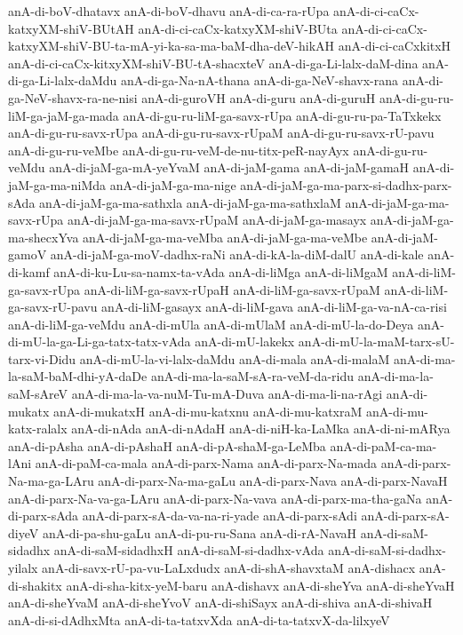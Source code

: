 {anA-di-boV-dhatavx
anA-di-boV-dhavu
anA-di-ca-ra-rUpa
anA-di-ci-caCx-katxyXM-shiV-BUtAH
anA-di-ci-caCx-katxyXM-shiV-BUta
anA-di-ci-caCx-katxyXM-shiV-BU-ta-mA-yi-ka-sa-ma-baM-dha-deV-hikAH
anA-di-ci-caCxkitxH
anA-di-ci-caCx-kitxyXM-shiV-BU-tA-shacxteV
anA-di-ga-Li-lalx-daM-dina
anA-di-ga-Li-lalx-daMdu
anA-di-ga-Na-nA-thana
anA-di-ga-NeV-shavx-rana
anA-di-ga-NeV-shavx-ra-ne-nisi
anA-di-guroVH
anA-di-guru
anA-di-guruH
anA-di-gu-ru-liM-ga-jaM-ga-mada
anA-di-gu-ru-liM-ga-savx-rUpa
anA-di-gu-ru-pa-TaTxkekx
anA-di-gu-ru-savx-rUpa
anA-di-gu-ru-savx-rUpaM
anA-di-gu-ru-savx-rU-pavu
anA-di-gu-ru-veMbe
anA-di-gu-ru-veM-de-nu-titx-peR-nayAyx
anA-di-gu-ru-veMdu
anA-di-jaM-ga-mA-yeYvaM
anA-di-jaM-gama
anA-di-jaM-gamaH
anA-di-jaM-ga-ma-niMda
anA-di-jaM-ga-ma-nige
anA-di-jaM-ga-ma-parx-si-dadhx-parx-sAda
anA-di-jaM-ga-ma-sathxla
anA-di-jaM-ga-ma-sathxlaM
anA-di-jaM-ga-ma-savx-rUpa
anA-di-jaM-ga-ma-savx-rUpaM
anA-di-jaM-ga-masayx
anA-di-jaM-ga-ma-shecxYva
anA-di-jaM-ga-ma-veMba
anA-di-jaM-ga-ma-veMbe
anA-di-jaM-gamoV
anA-di-jaM-ga-moV-dadhx-raNi
anA-di-kA-la-diM-dalU
anA-di-kale
anA-di-kamf
anA-di-ku-Lu-sa-namx-ta-vAda
anA-di-liMga
anA-di-liMgaM
anA-di-liM-ga-savx-rUpa
anA-di-liM-ga-savx-rUpaH
anA-di-liM-ga-savx-rUpaM
anA-di-liM-ga-savx-rU-pavu
anA-di-liM-gasayx
anA-di-liM-gava
anA-di-liM-ga-va-nA-ca-risi
anA-di-liM-ga-veMdu
anA-di-mUla
anA-di-mUlaM
anA-di-mU-la-do-Deya
anA-di-mU-la-ga-Li-ga-tatx-tatx-vAda
anA-di-mU-lakekx
anA-di-mU-la-maM-tarx-sU-tarx-vi-Didu
anA-di-mU-la-vi-lalx-daMdu
anA-di-mala
anA-di-malaM
anA-di-ma-la-saM-baM-dhi-yA-daDe
anA-di-ma-la-saM-sA-ra-veM-da-ridu
anA-di-ma-la-saM-sAreV
anA-di-ma-la-va-nuM-Tu-mA-Duva
anA-di-ma-li-na-rAgi
anA-di-mukatx
anA-di-mukatxH
anA-di-mu-katxnu
anA-di-mu-katxraM
anA-di-mu-katx-ralalx
anA-di-nAda
anA-di-nAdaH
anA-di-niH-ka-LaMka
anA-di-ni-mARya
anA-di-pAsha
anA-di-pAshaH
anA-di-pA-shaM-ga-LeMba
anA-di-paM-ca-ma-lAni
anA-di-paM-ca-mala
anA-di-parx-Nama
anA-di-parx-Na-mada
anA-di-parx-Na-ma-ga-LAru
anA-di-parx-Na-ma-gaLu
anA-di-parx-Nava
anA-di-parx-NavaH
anA-di-parx-Na-va-ga-LAru
anA-di-parx-Na-vava
anA-di-parx-ma-tha-gaNa
anA-di-parx-sAda
anA-di-parx-sA-da-va-na-ri-yade
anA-di-parx-sAdi
anA-di-parx-sA-diyeV
anA-di-pa-shu-gaLu
anA-di-pu-ru-Sana
anA-di-rA-NavaH
anA-di-saM-sidadhx
anA-di-saM-sidadhxH
anA-di-saM-si-dadhx-vAda
anA-di-saM-si-dadhx-yilalx
anA-di-savx-rU-pa-vu-LaLxdudx
anA-di-shA-shavxtaM
anA-dishacx
anA-di-shakitx
anA-di-sha-kitx-yeM-baru
anA-dishavx
anA-di-sheYva
anA-di-sheYvaH
anA-di-sheYvaM
anA-di-sheYvoV
anA-di-shiSayx
anA-di-shiva
anA-di-shivaH
anA-di-si-dAdhxMta
anA-di-ta-tatxvXda
anA-di-ta-tatxvX-da-lilxyeV
}

